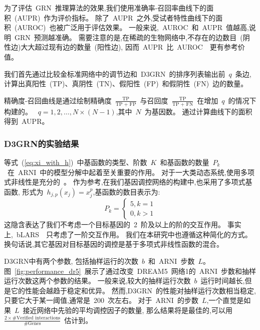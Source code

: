 为了评估~GRN~推理算法的效果,我们使用准确率-召回率曲线下的面积~(AUPR)~作为评价指标。
除了~AUPR~之外,受试者特性曲线下的面积~(AUROC)~也被广泛用于评估效果。
一般来说,~AUROC~和~AUPR~值越高,说明~GRN~预测越准确。
需要注意的是,在稀疏的生物网络中,不存在的边数目~(阴性边)大大超过现有边的数量~(阳性边),
因而~AUPR~比~AUROC~\cite{saito2015precision}~更有参考价值。

我们首先通过比较金标准网络中的调节边和~D3GRN~的排序列表输出前~$q$~条边,
计算出真阳性~(TP)、真阴性~(TN)、假阳性~(FP)~和假阴性~(FN)~边的数量。

精确度-召回曲线是通过绘制精确度~$\frac{\text{TP}}{\text{TP + FP}}$~与召回度~$\frac{\text{TP}}{\text{TP + FN}}$~在增加~$q$~的情况下构建的。
~$q = 1,2,\ldots,N\times(N-1)$,其中~$N$~为基因数。
通过计算曲线下的面积得到~AUPR。

\subsubsection{D3GRN的实验结果}
等式~(\ref{eq:xi_with_h})~中基函数的类型、阶数~$K$~和基函数的数量~$P_k$~在~ARNI~中的模型分解中起着至关重要的作用。
对于一大类动态系统,使用多项式非线性是充分的~\cite{mangan2016inferring}。
作为参考,在我们基因调控网络的构建中,也采用了多项式基函数,
形式为~$h_{j,p}(x_j)=x_j^p$,基函数的数目表示为: 
\begin{equation}
P_k=\left\{\begin{matrix}
5,  k=1\\ 
0,  k>1
\end{matrix}\right. 
\end{equation}
这隐含表达了我们不考虑一个目标基因的~2~阶及以上的阶的交互作用。
事实上,~bLARS~\cite{singh2016blars}~只考虑了一阶交互作用。
我们在本研究中也遵循这种简化的方式。
换句话说,其它基因对目标基因的调控是基于多项式非线性函数的混合。

D3GRN中有两个参数,
包括抽样运行的次数~$b$~和~ARNI~步数~$L$。
图~\ref{fig:performance_dr5}~展示了通过改变~DREAM5~网络1的~ARNI~步数和抽样运行次数这两个参数的结果。
一般来说,较大的抽样运行次数~$b$~运行时间越长,但是它的性能会越趋于稳定和优异。
然而,D3GRN~的性能对抽样运行次数相当稳定,只要它大于某一阈值,通常是~200~次左右。
对于~ARNI~的步数~$L$,一个直觉是如果~$L$~接近网络中先验的平均调控因子的数量,
那么结果将是最佳的,可以用~$\frac{2  \times \#\text{Verified interactions}}{\#\text{Genes}}$~估计到。
 
